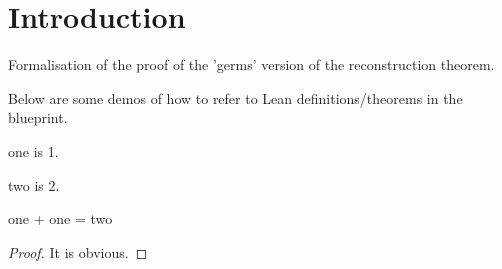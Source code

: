 \chapter{Introduction}
\label{chap:intro}

Formalisation of the proof of the 'germs' version of the reconstruction theorem.

Below are some demos of how to refer to Lean definitions/theorems in the blueprint.

\begin{definition}[One]
\label{one}
\leanok

    one is 1.

\end{definition}

\begin{definition}[Two]
\label{two}
\leanok

    two is 2.

\end{definition}

\begin{lemma}
\label{one_plus_one_eq_two}
\leanok

one + one = two

\end{lemma}

\begin{proof}
\leanok
It is obvious.
\end{proof}
